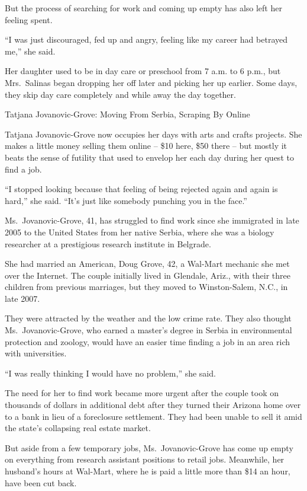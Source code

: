 ﻿\documentclass[12pt]{article}
\begin{document}
But the process of searching for work and coming up empty has also left her feeling spent.

``I was just discouraged, fed up and angry, feeling like my career had betrayed me,'' she said.

Her daughter used to be in day care or preschool from 7 a.m. to 6 p.m., but Mrs.~Salinas began
dropping her off later and picking her up earlier. Some days, they skip day care completely and
while away the day together.

Tatjana Jovanovic-Grove: Moving From Serbia, Scraping By Online

Tatjana Jovanovic-Grove now occupies her days with arts and crafts projects. She makes a little
money selling them online -- \$10 here, \$50 there -- but mostly it beats the sense of futility that
used to envelop her each day during her quest to find a job.

``I stopped looking because that feeling of being rejected again and again is hard,'' she said.
``It's just like somebody punching you in the face.''

Ms.~Jovanovic-Grove, 41, has struggled to find work since she immigrated in late 2005 to the United
States from her native Serbia, where she was a biology researcher at a prestigious research
institute in Belgrade.

She had married an American, Doug Grove, 42, a Wal-Mart mechanic she met over the Internet. The
couple initially lived in Glendale, Ariz., with their three children from previous marriages, but
they moved to Winston-Salem, N.C., in late 2007.

They were attracted by the weather and the low crime rate. They also thought Ms.~Jovanovic-Grove,
who earned a master's degree in Serbia in environmental protection and zoology, would have an easier
time finding a job in an area rich with universities.

``I was really thinking I would have no problem,'' she said.

The need for her to find work became more urgent after the couple took on thousands of dollars in
additional debt after they turned their Arizona home over to a bank in lieu of a foreclosure
settlement. They had been unable to sell it amid the state's collapsing real estate market.

But aside from a few temporary jobs, Ms.~Jovanovic-Grove has come up empty on everything from
research assistant positions to retail jobs. Meanwhile, her husband's hours at Wal-Mart, where he is
paid a little more than \$14 an hour, have been cut back.
\end{document}
